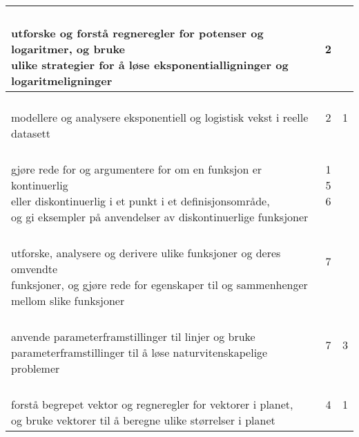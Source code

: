 \documentclass{article}
\begin{document}
\begin{center}
\begin{tabular}{p{10.5cm} | c | c |}
		\shortstack[l]{\\ utforske og forstå regneregler for potenser og logaritmer, og bruke\\ ulike strategier for å løse eksponentialligninger og logaritmeligninger
		} &
		\shortstack{2 \\{}} &\shortstack{} \\ \hline
		
		\shortstack[l]{\\ modellere og analysere eksponentiell og logistisk vekst i reelle\\ datasett
		} &
		\shortstack{2 \\{}} &\shortstack{1\\{}} \\ \hline	
								
		\shortstack[l]{\\ gjøre rede for og argumentere for om en funksjon er kontinuerlig\\ eller diskontinuerlig i et punkt i et definisjonsområde,\\ og gi eksempler på anvendelser av diskontinuerlige funksjoner
		} &
		\shortstack{1 \\ 5 \\ 6} &\shortstack{} \\ \hline	
		
		\shortstack[l]{\\ utforske, analysere og derivere ulike funksjoner og deres omvendte \\funksjoner, og gjøre rede for egenskaper til og sammenhenger\\ mellom slike funksjoner
		} &
		\shortstack{7\\{}\\{}} &\shortstack{} \\ \hline	
		
		\shortstack[l]{\\ anvende parameterframstillinger til linjer og bruke\\ parameterframstillinger til å løse naturvitenskapelige problemer
		} &
		\shortstack{7\\{}} &\shortstack{3\\{}} \\ \hline	
		
		\shortstack[l]{\\ forstå begrepet vektor og regneregler for vektorer i planet, \\og bruke vektorer til å beregne ulike størrelser i planet
		} &
		\shortstack{4\\{}} &\shortstack{1\\{}} \\ \hline								
		
	\end{tabular}
\end{center}\vspace{20pt}
\end{document}
